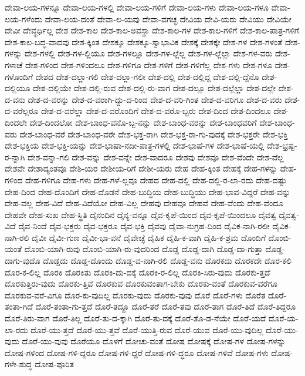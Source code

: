 {ದೇವಾ-ಲಯ-ಗಳನ್ನೂ
ದೇವಾ-ಲಯ-ಗಳಲ್ಲಿ
ದೇವಾ-ಲಯ-ಗಳಿಗೆ
ದೇವಾ-ಲಯ-ಗಳು
ದೇವಾ-ಲಯ-ಗಳೂ
ದೇವಾ-ಲಯ-ಗಳೆಂದು
ದೇವಾ-ಲಯ-ದಂತೆ
ದೇವಾ-ಲ-ಯವು
ದೇವಾ-ವಗಚ್ಛ
ದೇವಿಯ
ದೇವಿ-ಯರು
ದೇವಿಯು
ದೇವಿಯೇ
ದೇವೀ
ದೇವ್ಧರ್ಧಿಲ್ಲ
ದೇಶ
ದೇಶ-ಕಾಲ
ದೇಶ-ಕಾಲ-ಅವಸ್ಥಾ
ದೇಶ-ಕಾಲ-ಗಳ
ದೇಶ-ಕಾಲ-ಗಳಿಗೆ
ದೇಶ-ಕಾಲ-ಪಾತ್ರ-ಗಳಿಗೆ
ದೇಶ-ಕಾಲ-ಬದ್ಧ-ವಾದವು
ದೇಶ-ಕ್ಕಿಂತ
ದೇಶಕ್ಕೂ
ದೇಶಕ್ಕೂ-ಸ್ವಾಭಾವಿಕ
ದೇಶಕ್ಕೆ
ದೇಶಕ್ಕೇ
ದೇಶ-ಗಳ
ದೇಶ-ಗಳಂತೆ
ದೇಶ-ಗಳನ್ನು
ದೇಶ-ಗಳಲ್ಲಿ
ದೇಶ-ಗಳ-ಲ್ಲಿಯೂ
ದೇಶ-ಗಳಲ್ಲೂ
ದೇಶ-ಗಳ-ಲ್ಲೆಲ್ಲ
ದೇಶ-ಗಳ-ಲ್ಲೆಲ್ಲಾ
ದೇಶ-ಗಳ-ವರು
ದೇಶ-ಗಳಾಚೆ
ದೇಶ-ಗಳಿಂದ
ದೇಶ-ಗಳಿಂದಲೂ
ದೇಶ-ಗಳಿಗೂ
ದೇಶ-ಗಳಿಗೆ
ದೇಶ-ಗಳಿಗೆಲ್ಲ
ದೇಶ-ಗಳು
ದೇಶ-ಗಳೂ
ದೇಶ-ಗಳೊಂದಿಗೆ
ದೇಶದ
ದೇಶ-ದಲ್ಲಾ-ಗಲಿ
ದೇಶ-ದಲ್ಲಾ-ಗಲೀ
ದೇಶ-ದಲ್ಲಿ
ದೇಶ-ದಲ್ಲಿದ್ದ
ದೇಶ-ದಲ್ಲಿ-ದ್ದೆನೊ
ದೇಶ-ದಲ್ಲಿಯೂ
ದೇಶ-ದಲ್ಲಿಯೇ
ದೇಶ-ದಲ್ಲಿ-ರುವ
ದೇಶ-ದಲ್ಲಿ-ರು-ವಾಗ
ದೇಶ-ದಲ್ಲೂ
ದೇಶ-ದಲ್ಲೆಲ್ಲಾ
ದೇಶ-ದಲ್ಲೇ
ದೇಶ-ದ-ವನು
ದೇಶ-ದ-ವರನ್ನು
ದೇಶ-ದ-ವರಾಗಿ-ದ್ದು-ದ-ರಿಂದ
ದೇಶ-ದ-ವರಿ-ಗಿಂತ
ದೇಶ-ದ-ವರಿಗೂ
ದೇಶ-ದ-ವರು
ದೇಶ-ದ-ವರೆಲ್ಲರೂ
ದೇಶ-ದ-ವರೆಲ್ಲಾ
ದೇಶ-ದ-ವರೊಂದಿಗೆ
ದೇಶ-ದ-ವರೊ-ಬ್ಬರು
ದೇಶ-ದಿಂದ
ದೇಶ-ದಿಂದಲೂ
ದೇಶ-ದಿಂದಲೇ
ದೇಶ-ದಿಂದಲೋ
ದೇಶ-ಬಾಂಧ-ವನೊ-ಬ್ಬ-ನನ್ನು
ದೇಶ-ಬಾಂಧ-ವರನ್ನು
ದೇಶ-ಬಾಂಧವರಿಗೆ
ದೇಶ-ಬಾಂಧ-ವರು
ದೇಶ-ಬಾಂಧ-ವರೆ
ದೇಶ-ಬಾಂಧ-ವರೇ
ದೇಶ-ಭಕ್ತ-ರಾಗಿ
ದೇಶ-ಭಕ್ತ-ರಾ-ಗು-ವುದಕ್ಕೆ
ದೇಶ-ಭಕ್ತರೇ
ದೇಶ-ಭಕ್ತಿ
ದೇಶ-ಭಕ್ತಿಯ
ದೇಶ-ಭಕ್ತಿ-ಯನ್ನು
ದೇಶ-ಭಾಷಾ-ನದೀ-ಪಾತ್ರ-ಗಳಲ್ಲಿ
ದೇಶ-ಭಾಷೆ-ಗಳ
ದೇಶ-ಭಾಷೆ-ಯಲ್ಲಿ
ದೇಶ-ಭ್ರಷ್ಟ-ರ-ನ್ನಾಗಿ
ದೇಶ-ವನ್ನಾ-ಗಲಿ
ದೇಶ-ವನ್ನು
ದೇಶ-ವನ್ನೇ
ದೇಶ-ವಾದರೂ
ದೇಶವು
ದೇಶವೂ
ದೇಶ-ವೆಂದೇ
ದೇಶ-ವೆಲ್ಲ
ದೇಶವೇ
ದೇಶಾದ್ಯಂತವೂ
ದೇಶಿ-ಯರ
ದೇಶೀಯ-ರಿಗೆ
ದೇಶೀ-ಯರು
ದೇಹ
ದೇಹ-ಕ್ಕಿಂತ
ದೇಹಕ್ಕೆ
ದೇಹ-ಗಳನ್ನು
ದೇಹ-ಗಳಿಂದ
ದೇಹ-ಗಳಿಗೂ
ದೇಹ-ಗಳು
ದೇಹ-ಗಳೆ-ಲ್ಲವೂ
ದೇಹದ
ದೇಹ-ದಲ್ಲಿ
ದೇಹ-ದಲ್ಲಿ-ರ-ಲಾ-ರದು
ದೇಹ-ದಷ್ಟು
ದೇಹ-ದಿಂದ
ದೇಹ-ದೊಂದಿಗೆ
ದೇಹ-ದೊಡನೆ
ದೇಹ-ಬುದ್ಧಿಯ
ದೇಹ-ಬುದ್ಧಿಯು
ದೇಹ-ಭಾವ-ವಿದ್ದರೆ
ದೇಹ-ವನ್ನು
ದೇಹ-ವಲ್ಲ
ದೇಹ-ವಿದೆ
ದೇಹ-ವಿದೆಯೋ
ದೇಹ-ವಿಲ್ಲ
ದೇಹವು
ದೇಹವೂ
ದೇಹವೆ
ದೇಹ-ವೆಂದು
ದೇಹ-ವೆಂದೂ
ದೇಹವೇ
ದೇಹ-ಸುಖ
ದೇಹ-ಸ್ಥಿತಿ
ದೈನಂದಿನ
ದೈನ್ಯ-ವನ್ನೂ
ದೈವ-ಕೃಪೆ-ಯಿಂದ
ದೈವ-ಕೃಪೆ-ಯಿಂದಲೂ
ದೈವತ್ವ
ದೈವತ್ವ-ವಿದೆ
ದೈವ-ನಿಂದೆ
ದೈವ-ಭಕ್ತರು
ದೈವ-ಭಕ್ತರೂ
ದೈವ-ಭಕ್ತಿ
ದೈವವು
ದೈವಾ-ನುಗ್ರಹ-ದಿಂದ
ದೈವಿಕ-ನಾಗಿ-ರಲೀ
ದೈವಿಕ-ನಾಗಿ-ರಲಿ
ದೈವೀ
ದೈವೀ-ಗುಣ
ದೈವೀ-ಭಾ-ವನೆ
ದೈವೇಚ್ಛೆ
ದೈಹಿಕ
ದೈಹಿ-ಕ-ವಾಗಿ
ದೈಹಿ-ಕ-ಶ್ರಮ
ದೊಂದಿಗೆ
ದೊಂಬಿ-ಯಂತೆ
ದೊಂಬಿ-ಯಾಗಿ-ರುವು
ದೊಂಬಿ-ಯಾಗಿ-ರು-ವುದರಿಂದ
ದೊಡ್ಡ
ದೊಡ್ಡ-ದಾಗಿ
ದೊಡ್ಡ-ದಾ-ಗುತ್ತಾ
ದೊಡ್ಡ-ದಾಗು-ವುದೊ
ದೊಡ್ಡದು
ದೊಡ್ಡ-ದೊಂದು
ದೊಡ್ಡ-ವ-ನಾಗಿ-ರಲಿ
ದೊಡ್ಡ-ವನು
ದೊರಕದು
ದೊರಕದೇ
ದೊರ-ಕಲಿ
ದೊರ-ಕ-ಲಿಲ್ಲ
ದೊರಕಿ
ದೊರಕಿತು
ದೊರಕಿ-ದು-ದಕ್ಕೆ
ದೊರಕಿ-ರ-ಲಿಲ್ಲ
ದೊರಕಿ-ಸಿರು-ವುದು
ದೊರಕು-ತ್ತದೆ
ದೊರಕುತ್ತಿರು-ವುದು
ದೊರಕು-ತ್ತಿವೆ
ದೊರಕುವ
ದೊರಕುವಂತಾಗ-ಬೇಕು
ದೊರಕು-ವಂತೆ
ದೊರಕುವ-ವರೆಗೂ
ದೊರಕುವ-ವರೆ-ವಿಗೂ
ದೊರ-ಕು-ವುದಿಲ್ಲ
ದೊರಕು-ವುದು
ದೊರಕು-ವುವು
ದೊರೆ
ದೊರೆ-ಗಳು
ದೊರೆತ
ದೊರೆ-ತಂತಾ-ಗಿದೆ
ದೊರೆ-ತಂತಾ-ಗು-ತ್ತದೆ
ದೊರೆ-ತದ್ದೂ
ದೊರೆ-ತರೆ
ದೊರೆ-ತವು
ದೊರೆ-ತಾಗ
ದೊರೆ-ತಿದೆ
ದೊರೆ-ತಿದ್ದರೂ
ದೊರೆ-ತಿರು-ವಾಗ
ದೊರೆ-ತಿಲ್ಲ
ದೊರೆ-ತು-ದ-ಕ್ಕಾಗಿ
ದೊರೆ-ತು-ದಕ್ಕೆ
ದೊರೆ-ತೊ-ಡ-ನೆಯೇ
ದೊರೆ-ಯದೆ
ದೊರೆ-ಯ-ಲಾ-ರದು
ದೊರೆ-ಯು-ತ್ತದೆ
ದೊರೆ-ಯು-ತ್ತವೆ
ದೊರೆ-ಯುತ್ತಿ-ರುವ
ದೊರೆ-ಯುವ
ದೊರೆ-ಯು-ವುದಿಲ್ಲ
ದೊರೆ-ಯು-ವುದು
ದೊರೆ-ಯು-ವುವು
ದೊರೆಯೂ
ದೊಳಗೆ
ದೋಚು-ವಂತೆ
ದೋಷ
ದೋಷಕ್ಕೆ
ದೋಷ-ಗಳ
ದೋಷ-ಗಳನ್ನು
ದೋಷ-ಗಳಿಂದ
ದೋಷ-ಗಳಿ-ದ್ದರೂ
ದೋಷ-ಗಳಿ-ದ್ದರೆ
ದೋಷ-ಗಳಿ-ದ್ಧರೂ
ದೋಷ-ಗಳಿವೆ
ದೋಷ-ಗಳು
ದೋಷ-ಗಳೇ-ಶುದ್ಧ
ದೋಷ-ಪೂರಿತ
}
